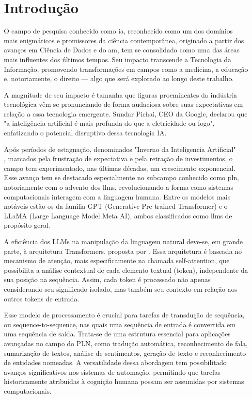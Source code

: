 \chapter{Introdução}

O campo de pesquisa conhecido como \gls{ia}, reconhecido como um dos domínios mais enigmáticos e promissores da ciência contemporânea, originado a partir dos avanços em Ciência de Dados e do \gls{am}, tem se consolidado como uma das áreas mais influentes dos últimos tempos. Seu impacto transcende a Tecnologia da Informação, promovendo transformações em campos como a medicina, a educação e, notoriamente, o direito --- algo que será explorado ao longo deste trabalho.

A magnitude de seu impacto é tamanha que figuras proeminentes da indústria tecnológica vêm se pronunciando de forma audaciosa sobre suas expectativas em relação a essa tecnologia emergente. Sundar Pichai, CEO da Google, declarou que "a inteligência artificial é mais profunda do que a eletricidade ou fogo", enfatizando o potencial disruptivo dessa tecnologia IA.

Após períodos de estagnação, denominados "Inverno da Inteligencia Artificial"  \\ \cite{russell_artificial_2016}, marcados pela frustração de expectativa e pela retração de investimentos, o campo tem experimentado, nas últimas décadas, um crescimento exponencial. Esse avanço tem se destacado especialmente no subcampo conhecido como \gls{pln}, notoriamente com o advento dos \gls{llm}s, revolucionando a forma como sistemas computacionais interagem com a linguagem humana. Entre os modelos mais notáveis estão os da família GPT (Generative Pre-trained Transformer) e o LLaMA (Large Language Model Meta AI), ambos classificados como \gls{llm}s de propósito geral.

A eficiência dos LLMs na manipulação da linguagem natural deve-se, em grande parte, à arquitetura Transformers, proposta por . Essa arquitetura é baseada no mecanismo de atenção, mais especificamente na chamada self-attention, que possibilita a análise contextual de cada elemento textual (token), independente da sua posição na sequência. Assim, cada token é processado não apenas considerando seu significado isolado, mas também seu contexto em relação aos outros tokens de entrada.  

Esse modelo de processamento é crucial para tarefas de transdução de sequência, ou sequence-to-sequence, nas quais uma sequência de entrada é convertida em uma sequência de saída. Trata-se de uma estrutura essencial para aplicações avançadas no campo do PLN, como tradução automática, reconhecimento de fala, sumarização de textos, análise de sentimentos, geração de texto e reconhecimento de entidades nomeadas. A versatilidade dessa abordagem tem possibilitado avanços significativos nos sistemas de automação, permitindo que tarefas historicamente atribuídas à cognição humana possam ser assumidas por sistemas computacionais.

